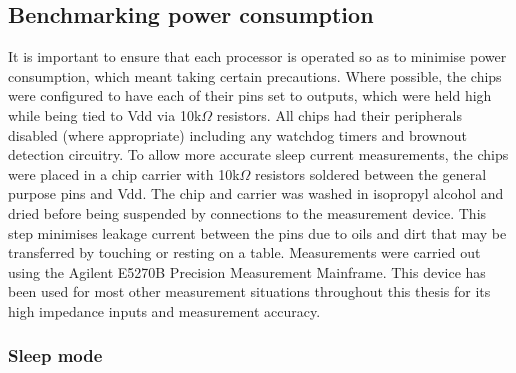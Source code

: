 


  \subsection{Benchmarking power consumption}

    It is important to ensure that each processor is operated so as to minimise power consumption, which meant taking certain precautions.
    Where possible, the chips were configured to have each of their pins set to outputs, which were held high while being tied to Vdd via 10k$\Omega$ resistors.
    All chips had their peripherals disabled (where appropriate) including any watchdog timers and brownout detection circuitry.
    To allow more accurate sleep current measurements, the chips were placed in a chip carrier with 10k$\Omega$ resistors soldered between the general purpose pins and Vdd.
    The chip and carrier was washed in isopropyl alcohol and dried before being suspended by connections to the measurement device.
    This step minimises leakage current between the pins due to oils and dirt that may be transferred by touching or resting on a table.
    Measurements were carried out using the Agilent E5270B Precision Measurement Mainframe.
    This device has been used for most other measurement situations throughout this thesis for its high impedance inputs and measurement accuracy.


    \subsubsection{Sleep mode}


